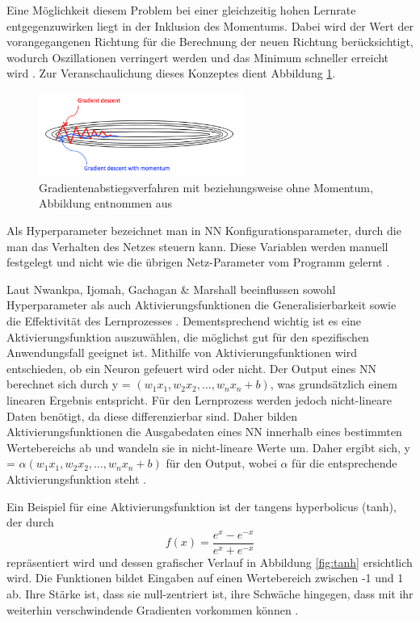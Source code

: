\documentclass[12pt,a4paper]{article}
\begin{document}

Eine Möglichkeit diesem Problem bei einer gleichzeitig hohen Lernrate entgegenzuwirken liegt in der Inklusion des Momentums. Dabei wird der Wert der vorangegangenen Richtung für die Berechnung der neuen Richtung berücksichtigt, wodurch Oszillationen verringert werden und das Minimum schneller erreicht wird \cite{Rumelhart1985}. Zur Veranschaulichung dieses Konzeptes dient Abbildung \ref{fig:sgd_momentum}.

\begin{figure}
\centering
\includegraphics[width=0.6\textwidth]{pics/sgd_momentum.png}	
\caption{Gradientenabstiegsverfahren mit beziehungsweise ohne Momentum, Abbildung entnommen aus \cite{MediumSGD}}
\label{fig:sgd_momentum}
\end{figure}

Als Hyperparameter bezeichnet man in NN Konfigurationsparameter, durch die man das Verhalten des Netzes steuern kann. Diese Variablen werden manuell festgelegt und nicht wie die übrigen Netz-Parameter vom Programm gelernt \cite[S. 113]{Goodfellow2015}.

Laut Nwankpa, Ijomah, Gachagan \& Marshall beeinflussen sowohl Hyperparameter als auch Aktivierungsfunktionen die Generalisierbarkeit sowie die Effektivität des Lernprozesses \cite{Nwankpa2018}. Dementsprechend wichtig ist es eine Aktivierungsfunktion auszuwählen, die möglichst gut für den spezifischen Anwendungsfall geeignet ist. Mithilfe von Aktivierungsfunktionen wird entschieden, ob ein Neuron gefeuert wird oder nicht. Der Output eines NN berechnet sich durch y = $(w_{1}x_{1}, w_{2}x_{2}, ..., w_{n}x_{n} + b)$, was grundsätzlich einem linearen Ergebnis entspricht. Für den Lernprozess werden jedoch nicht-lineare Daten benötigt, da diese differenzierbar sind. Daher bilden Aktivierungsfunktionen die Ausgabedaten eines NN innerhalb eines bestimmten Wertebereichs ab und wandeln sie in nicht-lineare Werte um. Daher ergibt sich, y = $ \alpha (w_{1}x_{1}, w_{2}x_{2}, ..., w_{n}x_{n} + b)$ für den Output, wobei $\alpha $ für die entsprechende Aktivierungsfunktion steht \cite{Nwankpa2018}.

Ein Beispiel für eine Aktivierungsfunktion ist der tangens hyperbolicus (tanh), der durch 
\begin{equation}
f(x) = \frac{e^x - e^{-x}}{e^x + e^{-x}}
\end{equation}
repräsentiert wird \cite{Nwankpa2018} und dessen grafischer Verlauf in Abbildung \ref{fig:tanh} ersichtlich wird. Die Funktionen bildet Eingaben auf einen Wertebereich zwischen -1 und 1 ab. Ihre Stärke ist, dass sie null-zentriert ist, ihre Schwäche hingegen, dass mit ihr weiterhin verschwindende Gradienten vorkommen können \cite{Nwankpa2018}.
\end{document}
